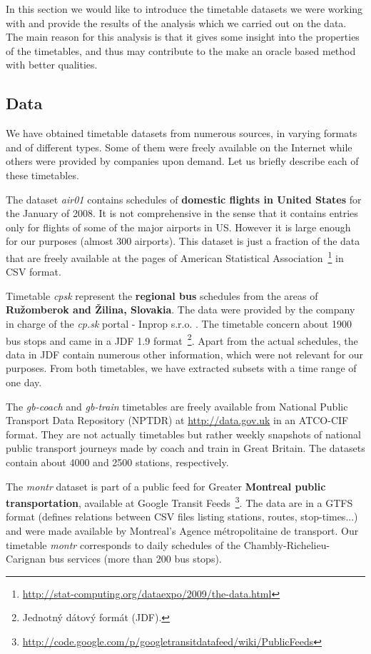 In this section we would like to introduce the timetable datasets we were working with and provide the results of the analysis which we carried out on the data. The main reason for this analysis is that it gives some insight into the properties of the timetables, and thus may contribute to the make an oracle based method with better qualities.

\subsection{Data}

	We have obtained timetable datasets from numerous sources, in varying formats and of different types. Some of them were freely available on the Internet while others were provided by companies upon demand. Let us briefly describe each of these timetables.
	
	The dataset \textit{air01} contains schedules of \textbf{domestic flights in United States} for the January of 2008. It is not comprehensive in the sense that it contains entries only for flights of some of the major airports in US. However it is large enough for our purposes (almost 300 airports). This dataset is just a fraction of the data that are freely available at the pages of American Statistical Association~\footnote{\url{http://stat-computing.org/dataexpo/2009/the-data.html}} in CSV format.
	
	Timetable \textit{cpsk} represent the \textbf{regional bus} schedules from the areas of \textbf{Ružomberok and Žilina, Slovakia}. The data were provided by the company in charge of the \textit{cp.sk} portal - Inprop s.r.o. . The timetable concern about 1900 bus stops and came in a JDF 1.9 format~\footnote{Jednotný dátový formát (JDF).}. Apart from the actual schedules, the data in JDF contain numerous other information, which were not relevant for our purposes. From both timetables, we have extracted subsets with a time range of one day.
	
	The \textit{gb-coach} and \textit{gb-train} timetables are freely available from National Public Transport Data Repository (NPTDR) at \url{http://data.gov.uk} in an ATCO-CIF format. They are not actually timetables but rather weekly snapshots of national public transport journeys made by coach and train in Great Britain. The datasets contain about 4000 and 2500 stations, respectively.
	
	The \textit{montr} dataset is part of a public feed for Greater \textbf{Montreal public transportation}, available at Google Transit Feeds~\footnote{\url{http://code.google.com/p/googletransitdatafeed/wiki/PublicFeeds}}. The data are in a GTFS format (defines relations between CSV files listing stations, routes, stop-times...) and were made available by Montreal's Agence métropolitaine de transport. Our timetable \textit{montr} corresponds to daily schedules of the Chambly-Richelieu-Carignan bus services (more than 200 bus stops).
	
